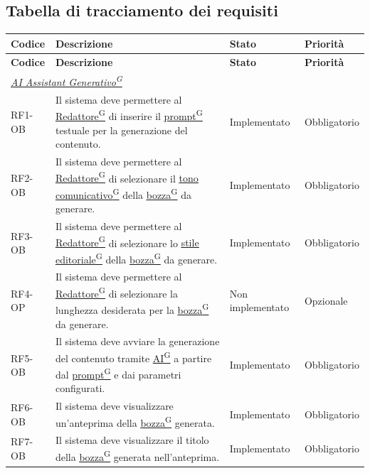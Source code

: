 \documentclass[a4paper,12pt]{article}
\providecommand{\glslink}[2]{\href{https://alittlebyte-19.github.io/Documentazione/glossario.html\#gls-#1}{\underline{#2}\textsuperscript{\scriptsize G}}}
\begin{document}
\begin{sloppypar}
\subsection{Tabella di tracciamento dei requisiti}

\renewcommand{\arraystretch}{1.3}
{\footnotesize
\setlength{\LTleft}{0pt}
\setlength{\LTright}{0pt}
\setlength{\tabcolsep}{4pt}
\begin{longtable}{|p{1.8cm}|p{8.7cm}|p{2.4cm}|p{2.1cm}|}
    \hline
    \rowcolor{gray!20}
    \textbf{Codice} & \textbf{Descrizione} & \textbf{Stato} & \textbf{Priorità} \\
    \hline
    \endfirsthead
    \hline
    \rowcolor{gray!20}
    \textbf{Codice} & \textbf{Descrizione} & \textbf{Stato} & \textbf{Priorità} \\
    \hline
    \endhead
    \multicolumn{4}{l}{\textit{\glslink{ai-assistant-generativo}{AI Assistant Generativo}}} \\
    \hline
    RF1-OB & Il sistema deve permettere al \glslink{redattore}{Redattore} di inserire il \glslink{prompt}{prompt} testuale per la generazione del contenuto. & Implementato & Obbligatorio \\
    \hline
    RF2-OB & Il sistema deve permettere al \glslink{redattore}{Redattore} di selezionare il \glslink{tono-comunicativo}{tono comunicativo} della \glslink{bozza-draft}{bozza} da generare. & Implementato & Obbligatorio \\
    \hline
    RF3-OB & Il sistema deve permettere al \glslink{redattore}{Redattore} di selezionare lo \glslink{stile-editoriale}{stile editoriale} della \glslink{bozza-draft}{bozza} da generare. & Implementato & Obbligatorio \\
    \hline
    RF4-OP & Il sistema deve permettere al \glslink{redattore}{Redattore} di selezionare la lunghezza desiderata per la \glslink{bozza-draft}{bozza} da generare. & Non implementato & Opzionale \\
    \hline
    RF5-OB & Il sistema deve avviare la generazione del contenuto tramite \glslink{intelligenza-artificiale-ai}{AI} a partire dal \glslink{prompt}{prompt} e dai parametri configurati. & Implementato & Obbligatorio \\
    \hline
    RF6-OB & Il sistema deve visualizzare un'anteprima della \glslink{bozza-draft}{bozza} generata. & Implementato & Obbligatorio \\
    \hline
    RF7-OB & Il sistema deve visualizzare il titolo della \glslink{bozza-draft}{bozza} generata nell'anteprima. & Implementato & Obbligatorio \\

\end{longtable}}
\end{sloppypar}
\end{document}
